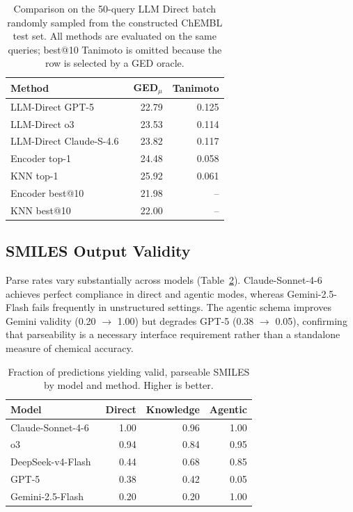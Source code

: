 \documentclass[conference]{IEEEtran}
\begin{document}
\begin{table}[t]
\centering
\scriptsize
\caption{Comparison on the 50-query LLM Direct batch randomly sampled from the constructed ChEMBL test set. All methods are evaluated on the same queries; best@10 Tanimoto is omitted because the row is selected by a GED oracle.}
\label{tab:paired_direct}
\begin{tabular}{lrr}
\toprule
Method & GED$_\mu$ & Tanimoto\\
\midrule
LLM-Direct GPT-5~\cite{gpt-5} & 22.79 & 0.125\\
LLM-Direct o3~\cite{o3_and_o4-mini} & 23.53 & 0.114\\
LLM-Direct Claude-S-4.6~\cite{claude-sonnet-4-6} & 23.82 & 0.117\\
Encoder top-1 & 24.48 & 0.058\\
KNN top-1 & 25.92 & 0.061\\
Encoder best@10 & 21.98 & --\\
KNN best@10 & 22.00 & --\\
\bottomrule
\end{tabular}
\end{table}

\subsection{SMILES Output Validity}

Parse rates vary substantially across models (Table~\ref{tab:parsing}). Claude-Sonnet-4-6 achieves perfect compliance in direct and agentic modes, whereas Gemini-2.5-Flash fails frequently in unstructured settings. The agentic schema improves Gemini validity (0.20 $\rightarrow$ 1.00) but degrades GPT-5 (0.38 $\rightarrow$ 0.05), confirming that parseability is a necessary interface requirement rather than a standalone measure of chemical accuracy.

\begin{table}[t]
\centering
\scriptsize
\caption{Fraction of predictions yielding valid, parseable SMILES by model and method. Higher is better.}
\label{tab:parsing}
\begin{tabular}{lrrr}
\toprule
Model & Direct & Knowledge & Agentic\\
\midrule
Claude-Sonnet-4-6~\cite{claude-sonnet-4-6} & 1.00 & 0.96 & 1.00\\
o3~\cite{o3_and_o4-mini} & 0.94 & 0.84 & 0.95\\
DeepSeek-v4-Flash~\cite{deepseek2026deepseek} & 0.44 & 0.68 & 0.85\\
GPT-5~\cite{gpt-5} & 0.38 & 0.42 & 0.05\\
Gemini-2.5-Flash~\cite{gemini2-5} & 0.20 & 0.20 & 1.00\\
\bottomrule
\end{tabular}
\end{table}
\end{document}

